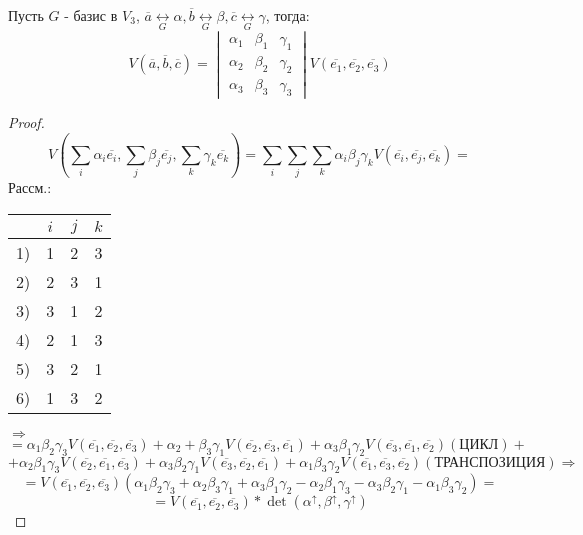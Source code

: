 \begin{statement}
Пусть $G$ - базис в $V_3$, $\overline{a} \underset{G}{\longleftrightarrow}\alpha, \overline{b} \underset{G}{\longleftrightarrow} \beta, \overline{c} \underset{G}{\longleftrightarrow} \gamma$, тогда:
\[
  V\left(\overline{a}, \overline{b}, \overline{c}\right) = \begin{vmatrix}\alpha_1 & \beta_1 & \gamma_1 \\ \alpha_2 & \beta_2 & \gamma_2 \\ \alpha_3 & \beta_3 & \gamma_3 \end{vmatrix} V\left(\overline{e_1}, \overline{e_2}, \overline{e_3}\right)
\]
\end{statement}
\begin{proof}
\[
V\left(\sum_{i}^{}\alpha_i \overline{e_i}, \sum_{j}^{}\beta_j \overline{e_j}, \sum_{k}^{}\gamma_k \overline{e_k}\right) = \sum_{i}^{}\sum_{j}^{}\sum_{k}^{}\alpha_i \beta_j \gamma_k V\left(\overline{e_i}, \overline{e_j}, \overline{e_k}\right) = 
\]
Рассм.:
\begin{center}
\begin{tabular}{ |c|c|c|c| } 
 \hline
  & $i$ & $j$ & $k$ \\
 \hline
1)&  1 & 2 & 3 \\
 \hline
2) & 2 & 3 & 1 \\
 \hline
3)& 3 & 1 & 2 \\
 \hline
4) & 2 & 1 & 3 \\
 \hline
5)& 3 & 2 & 1 \\
 \hline
6)& 1 & 3 & 2 \\
 \hline
\end{tabular}
\end{center}
$\Rightarrow$
\[
= \alpha_1\beta_2\gamma_3 V\left(\overline{e_1}, \overline{e_2}, \overline{e_3}\right) + \alpha_2 + \beta_3 \gamma_1 V\left(\overline{e_2}, \overline{e_3}, \overline{e_1}\right) + \alpha_3\beta_1\gamma_2 V\left(\overline{e_3}, \overline{e_1}, \overline{e_2}\right) \left(\text{ЦИКЛ}\right) + 
\]
\[
+ \alpha_2 \beta_1 \gamma_3 V\left(\overline{e_2}, \overline{e_1}, \overline{e_3}\right) + \alpha_3\beta_2\gamma_1V\left(\overline{e_3}, \overline{e_2}, \overline{e_1}\right) + \alpha_1\beta_3\gamma_2 V\left(\overline{e_1}, \overline{e_3}, \overline{e_2}\right) \left(\text{ТРАНСПОЗИЦИЯ}\right) \Rightarrow
\]
\[
= V\left(\overline{e_1}, \overline{e_2}, \overline{e_3}\right) \left(\alpha_1\beta_2\gamma_3 + \alpha_2\beta_3\gamma_1 + \alpha_3\beta_1\gamma_2 - \alpha_2\beta_1\gamma_3 - \alpha_3\beta_2\gamma_1 - \alpha_1\beta_3\gamma_2 \right) = 
\]
\[
  = V\left(\overline{e_1}, \overline{e_2}, \overline{e_3}\right) * \det \left(\alpha^{\uparrow}, \beta^{\uparrow}, \gamma^{\uparrow}\right)
\]
\end{proof}
